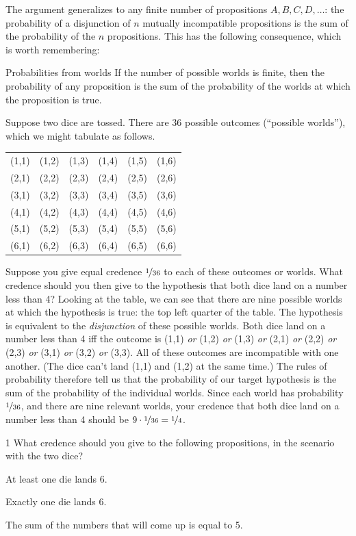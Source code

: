 The argument generalizes to any finite number of propositions
$A,B,C,D,\ldots$: the probability of a disjunction of $n$ mutually
incompatible propositions is the sum of the probability of the $n$
propositions. This has the following consequence, which is worth
remembering:

\begin{genericthm}{Probabilities from worlds}
  If the number of possible worlds is finite, then the probability of
  any proposition is the sum of the probability of the worlds at which
  the proposition is true.
\end{genericthm}

Suppose two dice are tossed. There are 36 possible
outcomes (``possible worlds''), which we might tabulate as follows.
%
\begin{center}
\begin{tabular}{cccccc}
  (1,1) & (1,2) & (1,3) & (1,4) & (1,5) & (1,6)\\
  (2,1) & (2,2) & (2,3) & (2,4) & (2,5) & (2,6)\\
  (3,1) & (3,2) & (3,3) & (3,4) & (3,5) & (3,6)\\
  (4,1) & (4,2) & (4,3) & (4,4) & (4,5) & (4,6)\\
  (5,1) & (5,2) & (5,3) & (5,4) & (5,5) & (5,6)\\
  (6,1) & (6,2) & (6,3) & (6,4) & (6,5) & (6,6)
\end{tabular}
\end{center}
%
Suppose you give equal credence $\nicefrac{1}{36}$ to each of these outcomes or
worlds. What credence should you then give to the hypothesis that both dice land
on a number less than 4? Looking at the table, we can see that there are nine
possible worlds at which the hypothesis is true: the top left quarter of the
table. The hypothesis is equivalent to the \emph{disjunction} of these possible
worlds. Both dice land on a number less than 4 iff the outcome is (1,1)
\emph{or} (1,2) \emph{or} (1,3) \emph{or} (2,1) \emph{or} (2,2) \emph{or} (2,3)
\emph{or} (3,1) \emph{or} (3,2) \emph{or} (3,3). All of these outcomes are
incompatible with one another. (The dice can't land (1,1) and (1,2) at the same
time.) The rules of probability therefore tell us that the probability of our
target hypothesis is the sum of the probability of the individual worlds. Since
each world has probability $\nicefrac{1}{36}$, and there are nine relevant worlds,
your credence that both dice land on a number less than 4 should be
$9 \cdot \nicefrac{1}{36} = \nicefrac{1}{4}$.
\begin{exercise}{1}
  What credence should you give to the following propositions, in the
  scenario with the two dice?
  \begin{exlist}
  \item At least one die lands 6.
  \item Exactly one die lands 6.
  \item The sum of the numbers that will come up is equal to 5.
  \end{exlist}
\end{exercise}


